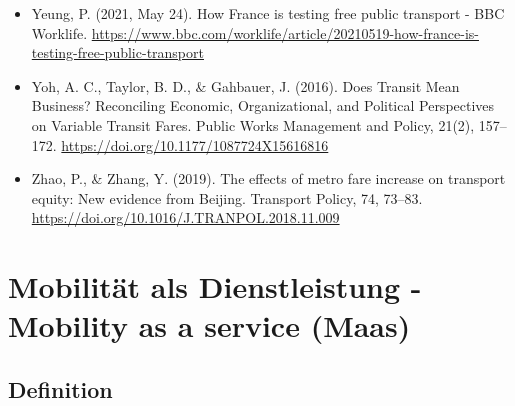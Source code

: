 \documentclass[
]{book}
\begin{document}
\begin{itemize}
\item
  Yeung, P. (2021, May 24). How France is testing free public transport - BBC Worklife. \url{https://www.bbc.com/worklife/article/20210519-how-france-is-testing-free-public-transport}
\item
  Yoh, A. C., Taylor, B. D., \& Gahbauer, J. (2016). Does Transit Mean Business? Reconciling Economic, Organizational, and Political Perspectives on Variable Transit Fares. Public Works Management and Policy, 21(2), 157--172. \url{https://doi.org/10.1177/1087724X15616816}
\item
  Zhao, P., \& Zhang, Y. (2019). The effects of metro fare increase on transport equity: New evidence from Beijing. Transport Policy, 74, 73--83. \url{https://doi.org/10.1016/J.TRANPOL.2018.11.009}
\end{itemize}

\hypertarget{maas}{%
\section{Mobilität als Dienstleistung - Mobility as a service (Maas)}\label{maas}}

\hypertarget{definition-24}{%
\subsection*{Definition}\label{definition-24}}
\end{document}
